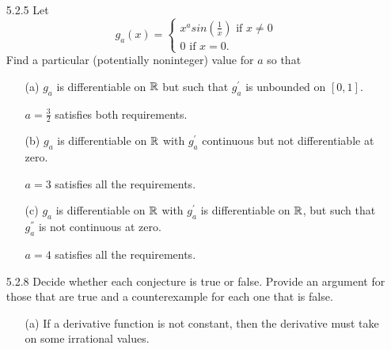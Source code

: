 \documentclass[12pt,letterpaper]{article}
\begin{document}
\begin{itemize}[leftmargin=!,labelindent=5pt]
\begin{itemize}
\begin{proof}
\begin{align*}
                            &= \frac{1}{x-c} (\frac{f(x)g(c) - g(x)f(c)}{g(x)g(c)})\\
                            &= \frac{1}{g(x)g(c)} (\frac{f(x)g(c) - f(c)g(c) + f(c)g(c) - g(x)f(c)}{x-c})\\
                            &= \frac{1}{g(x)g(c)} (g(c)\frac{f(x) - f(c)}{x-c} - f(c)\frac{g(x) - g(c)}{x-c})
                        \end{align*}
                        Because $f$ and $g$ are differentiable at $c$, it is continuous there and thus $\lim_{x \to c} f(x) = f(c)$ and $\lim_{x \to c} g(x) = g(c)$.
                        Using this with the Algebraic Limit Theorem for functional limits, we can simplify the answer to $\frac{1}{(g(c))^2} (g(c)f'(c)-f(c)g'(c))$.
                        \\Thus, $(\frac{f}{g})'(c) = \frac{g(c)f'(c)-f(c)g'(c)}{(g(c))^2}$ as desired.
                    \end{proof}
            \end{itemize}
        \item [5.2.5] Let
            \[
                g_a(x) = 
            \begin{cases}
                x^a sin(\frac{1}{x}) \text{ if } x \neq 0 \\
                0 \text{ if } x = 0.
            \end{cases}
            \]
            Find a particular (potentially noninteger) value for $a$ so that
            \begin{itemize}
                \item [(a)] $g_a$ is differentiable on $\mathbb{R}$ but such that $g_a^{'}$ is unbounded on $[0,1]$.

                    $a = \frac{3}{2}$ satisfies both requirements.
                \item [(b)] $g_a$ is differentiable on $\mathbb{R}$ with $g_a^{'}$ continuous but not differentiable at zero.
                
                    $a = 3$ satisfies all the requirements.
                \item [(c)] $g_a$ is differentiable on $\mathbb{R}$ with $g_a^{'}$ is differentiable on $\mathbb{R}$, but such that $g_a^{''}$ is not continuous at zero.
                
                    $a = 4$ satisfies all the requirements.
            \end{itemize}
        \item [5.2.8] Decide whether each conjecture is true or false. Provide an argument for those that are true and a counterexample for each one that is false.
            \begin{itemize}
                \item [(a)] If a derivative function is not constant, then the derivative must take on
                some irrational values.


\end{itemize}
\end{itemize}
\end{document}
